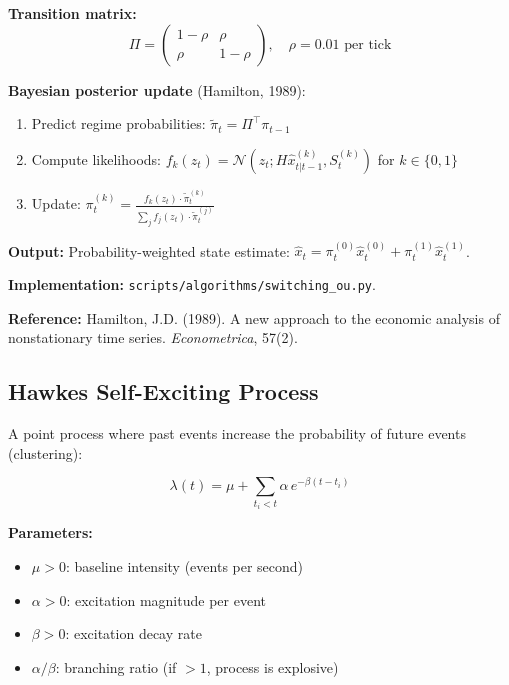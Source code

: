\documentclass[11pt,a4paper]{article}
\begin{document}
\textbf{Transition matrix:}
\begin{equation}
\Pi = \begin{pmatrix} 1 - \rho & \rho \\ \rho & 1 - \rho \end{pmatrix}, \quad \rho = 0.01 \text{ per tick}
\end{equation}

\textbf{Bayesian posterior update} (Hamilton, 1989):
\begin{enumerate}
    \item Predict regime probabilities: $\tilde{\pi}_t = \Pi^\top \pi_{t-1}$
    \item Compute likelihoods: $f_k(z_t) = \mathcal{N}(z_t; H\hat{x}_{t|t-1}^{(k)}, S_t^{(k)})$ for $k \in \{0, 1\}$
    \item Update: $\pi_t^{(k)} = \frac{f_k(z_t) \cdot \tilde{\pi}_t^{(k)}}{\sum_j f_j(z_t) \cdot \tilde{\pi}_t^{(j)}}$
\end{enumerate}

\textbf{Output:} Probability-weighted state estimate: $\hat{x}_t = \pi_t^{(0)} \hat{x}_t^{(0)} + \pi_t^{(1)} \hat{x}_t^{(1)}$.

\textbf{Implementation:} \texttt{scripts/algorithms/switching\_ou.py}.

\textbf{Reference:} Hamilton, J.D. (1989). A new approach to the economic analysis of nonstationary time series. \textit{Econometrica}, 57(2).

\subsection{Hawkes Self-Exciting Process}

A point process where past events increase the probability of future events (clustering):

\begin{equation}
\lambda(t) = \mu + \sum_{t_i < t} \alpha \, e^{-\beta(t - t_i)}
\end{equation}

\textbf{Parameters:}
\begin{itemize}
    \item $\mu > 0$: baseline intensity (events per second)
    \item $\alpha > 0$: excitation magnitude per event
    \item $\beta > 0$: excitation decay rate
    \item $\alpha / \beta$: branching ratio (if $> 1$, process is explosive)
\end{itemize}
\end{document}
